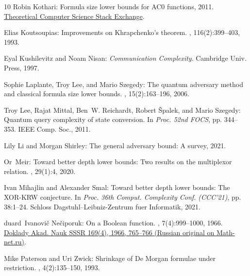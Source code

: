 \documentclass[11pt]{article}
\numberwithin{equation}{section}
\theoremstyle{definition}
\theoremstyle{plain}
\theoremstyle{definition}\newtheorem{notation}[theorem]{Notation}\theoremstyle{plain}
\begin{document}
\begin{thebibliography}{10}
{\sc Robin Kothari}: Formula size lower bounds for {AC0} functions, 2011.
\newblock
  \href{https://cstheory.stackexchange.com/questions/7156/formula-size-lower-bounds-for-ac0-functions}{Theoretical
  Computer Science Stack Exchange}.

{\sc Elias Koutsoupias}: Improvements on {Khrapchenko}'s theorem.
, 116(2):399--403, 1993.
\newblock [\epfmtdoi{10.1016/0304-3975(93)90330-V}]

{\sc Eyal Kushilevitz and Noam Nisan}: {\em Communication Complexity}.
\newblock Cambridge Univ. Press, 1997.
\newblock [\epfmtdoi{10.1017/9781108671644}]

{\sc Sophie Laplante, Troy Lee, and Mario Szegedy}: The quantum adversary
  method and classical formula size lower bounds.
, 15(2):163--196, 2006.
\newblock [\epfmtdoi{10.1007/s00037-006-0212-7}]

{\sc Troy Lee, Rajat Mittal, Ben~W. Reichardt, Robert {\v{S}}palek, and Mario
  Szegedy}: Quantum query complexity of state conversion.
\newblock In {\em Proc. 52nd FOCS}, pp. 344--353. IEEE Comp. Soc., 2011.

{\sc Lily Li and Morgan Shirley}: The general adversary bound: A survey, 2021.

{\sc Or~Meir}: Toward better depth lower bounds: Two results on the multiplexor
  relation.
, 29(1):4, 2020.
\newblock [\epfmtdoi{10.1007/s00037-020-00194-8}]

{\sc Ivan Mihajlin and Alexander Smal}: Toward better depth lower bounds: The
  {XOR-KRW} conjecture.
\newblock In {\em Proc. 36th Comput. Complexity Conf. (CCC'21)}, pp. 38:1--24.
  Schloss Dagstuhl--Leibniz-Zentrum fuer Informatik, 2021.

{duard~Ivanovi{\v c} Ne{\v c}iporuk}: On a {B}oolean function.
, 7(4):999--1000, 1966.
\newblock \href{http://mi.mathnet.ru/dan32449}{Doklady Akad. Nauk SSSR 169(4),
  1966, 765--766 (Russian original on Math-net.ru)}.

{\sc Mike Paterson and Uri Zwick}: Shrinkage of {D}e {M}organ formulae under
  restriction.
, 4(2):135--150, 1993.


\end{thebibliography}
\end{document}
